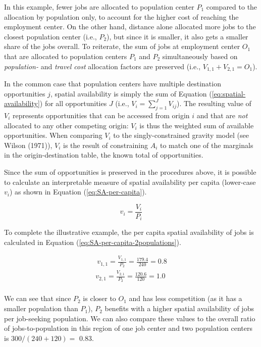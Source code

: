 \documentclass[]{elsarticle} %
\begin{document}
In this example, fewer jobs are allocated to population center \(P_1\)
compared to the allocation by population only, to account for the higher
cost of reaching the employment center. On the other hand, distance
alone allocated more jobs to the closest population center (i.e.,
\(P_2\)), but since it is smaller, it also gets a smaller share of the
jobs overall. To reiterate, the sum of jobs at employment center \(O_1\)
that are allocated to population centers \(P_1\) and \(P_2\)
simultaneously based on \emph{population-} and \emph{travel cost}
allocation factors are preserved (i.e., \(V_{1,1} + V_{2,1} = O_1\)).

In the common case that population centers have multiple destination
opportunities \(j\), spatial availability is simply the sum of Equation
(\ref{eq:spatial-availability}) for all opportunities \(J\) (i.e.,
\(V_i = \sum_{j=1}^J V_{ij}\)). The resulting value of \(V_i\)
represents opportunities that can be accessed from origin \(i\) and that
are \emph{not} allocated to any other competing origin: \(V_i\) is thus
the weighted sum of available opportunities. When comparing \(V_i\) to
the singly-constrained gravity model (see Wilson (1971)), \(V_i\) is the
result of constraining \(A_i\) to match one of the marginals in the
origin-destination table, the known total of opportunities.

Since the sum of opportunities is preserved in the procedures above, it
is possible to calculate an interpretable measure of spatial
availability per capita (lower-case \(v_i\)) as shown in Equation
(\ref{eq:SA-per-capita}).

\begin{equation}
\label{eq:SA-per-capita}
v_i = \frac{V_i}{P_i}
\end{equation}

To complete the illustrative example, the per capita spatial
availability of jobs is calculated in Equation
(\ref{eq:SA-per-capita-2populations}).

\begin{equation}
\label{eq:SA-per-capita-2populations}
\begin{array}{l}\
v_{1,1} = \frac{V_{1,1}}{P_2} =  \frac{179.4}{240} = 0.8\\
v_{2,1} =  \frac{V_{2,1}}{P_2} =  \frac{120.6}{120} = 1.0\\
\end{array}
\end{equation}

We can see that since \(P_2\) is closer to \(O_1\) and has less
competition (as it has a smaller population than \(P_1\)), \(P_2\)
benefits with a higher spatial availability of jobs per job-seeking
population. We can also compare these values to the overall ratio of
jobs-to-population in this region of one job center and two population
centers is \(300/(240 + 120)=\) 0.83.
\end{document}
